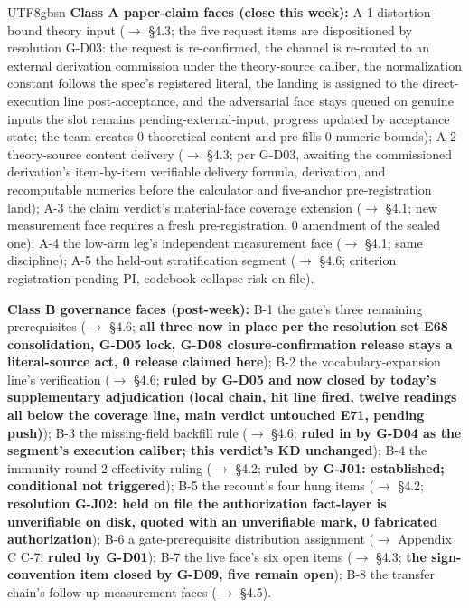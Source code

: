 \documentclass[11pt,letterpaper]{article}
\begin{document}
\begin{CJK}{UTF8}{gbsn}
\textbf{Class A \textemdash{} paper-claim faces (close this week):} A-1 distortion-bound theory input (\ensuremath{\to} \S{}4.3; the five request items are dispositioned by resolution G-D03: the request is re-confirmed, the channel is re-routed to an external derivation commission under the theory-source caliber, the normalization constant follows the spec's registered literal, the landing is assigned to the direct-execution line post-acceptance, and the adversarial face stays queued on genuine inputs \textemdash{} the slot remains pending-external-input, progress updated by acceptance state; the team creates 0 theoretical content and pre-fills 0 numeric bounds); A-2 theory-source content delivery (\ensuremath{\to} \S{}4.3; per G-D03, awaiting the commissioned derivation's item-by-item verifiable delivery \textemdash{} formula, derivation, and recomputable numerics \textemdash{} before the calculator and five-anchor pre-registration land); A-3 the claim verdict's material-face coverage extension (\ensuremath{\to} \S{}4.1; new measurement face requires a fresh pre-registration, 0 amendment of the sealed one); A-4 the low-arm leg's independent measurement face (\ensuremath{\to} \S{}4.1; same discipline); A-5 the held-out stratification segment (\ensuremath{\to} \S{}4.6; criterion registration pending PI, codebook-collapse risk on file).

\textbf{Class B \textemdash{} governance faces (post-week):} B-1 the gate's three remaining prerequisites (\ensuremath{\to} \S{}4.6; \textbf{all three now in place per the resolution set \textemdash{} E68 consolidation, G-D05 lock, G-D08 closure-confirmation \textemdash{} release stays a literal-source act, 0 release claimed here}); B-2 the vocabulary-expansion line's verification (\ensuremath{\to} \S{}4.6; \textbf{ruled by G-D05 and now closed by today's supplementary adjudication (local chain, hit line fired, twelve readings all below the coverage line, main verdict untouched \textemdash{} E71, pending push)}); B-3 the missing-field backfill rule (\ensuremath{\to} \S{}4.6; \textbf{ruled in by G-D04 as the segment's execution caliber; this verdict's KD unchanged}); B-4 the immunity round-2 effectivity ruling (\ensuremath{\to} \S{}4.2; \textbf{ruled by G-J01: established; conditional not triggered}); B-5 the recount's four hung items (\ensuremath{\to} \S{}4.2; \textbf{resolution G-J02: held on file \textemdash{} the authorization fact-layer is unverifiable on disk, quoted with an unverifiable mark, 0 fabricated authorization}); B-6 a gate-prerequisite distribution assignment (\ensuremath{\to} Appendix C C-7; \textbf{ruled by G-D01}); B-7 the live face's six open items (\ensuremath{\to} \S{}4.3; \textbf{the sign-convention item closed by G-D09, five remain open}); B-8 the transfer chain's follow-up measurement faces (\ensuremath{\to} \S{}4.5).


\end{CJK}
\end{document}
